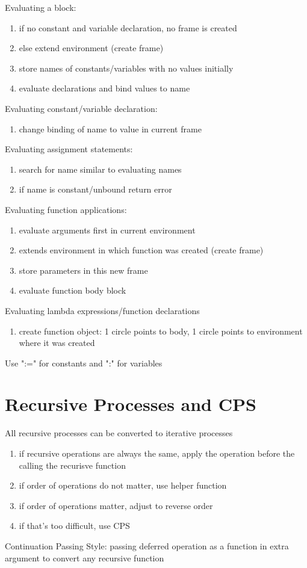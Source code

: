 \documentclass[landscape, a4paper]{article}
\newcommand{\customsection}[1]{
    \vspace{-5pt}
    \section*{#1}
    \vspace{-4pt}
}
\begin{document}
\begin{multicols*}{4}
  Evaluating a block:
  \begin{enumerate}
    \item if no constant and variable declaration, no frame is created
    \item else extend environment (create frame)
    \item store names of constants/variables with no values initially
    \item evaluate declarations and bind values to name
  \end{enumerate}
  Evaluating constant/variable declaration:
  \begin{enumerate}
    \item change binding of name to value in current frame
  \end{enumerate}
  Evaluating assignment statements:
  \begin{enumerate}
    \item search for name similar to evaluating names
    \item if name is constant/unbound return error
  \end{enumerate}
  Evaluating function applications:
  \begin{enumerate}
    \item evaluate arguments first in current environment
    \item extends environment in which function was created (create frame)
    \item store parameters in this new frame
    \item evaluate function body block
  \end{enumerate}
  Evaluating lambda expressions/function declarations
  \begin{enumerate}
    \item create function object: 1 circle points to body, 1 circle points to environment where it was created
  \end{enumerate}
  Use ":=" for constants and ":" for variables
  \customsection{Recursive Processes and CPS}
  All recursive processes can be converted to iterative processes
  \begin{enumerate}
    \item if recursive operations are always the same, apply the operation before the calling the recurisve function
    \item if order of operations do not matter, use helper function
    \item if order of operations matter, adjust to reverse order
    \item if that's too difficult, use CPS
  \end{enumerate}
  Continuation Passing Style: passing deferred operation as a function in extra argument to convert any recursive function


\end{multicols*}
\end{document}

